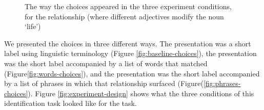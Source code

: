 \begin{figure}
\caption{\label{fig:choices} The way the choices appeared in the three experiment conditions, for the relationship  (where different adjectives modify the noun `life')}
\end{figure}

We presented the choices in three different ways. The  presentation was a short label using linguistic terminology (Figure \ref{fig:baseline-choices}), the  presentation was the short label accompanied by a list of words that matched (Figure\ref{fig:words-choices}), and the  presentation was the short label accompanied by a list of phrases in which that relationship surfaced (Figure(\ref{fig:phrases-choices}).  Figure \ref{fig:experiment-design} shows what the three conditions of this identification task looked like for the  task.


